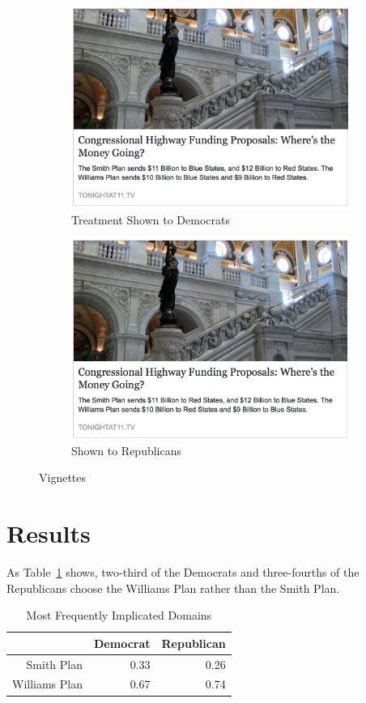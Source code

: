 \documentclass[12pt, letterpaper]{article}
\begin{document}
\begin{figure}[H]
\begin{subfigure}{.5\textwidth}
  \centering
  \includegraphics[width=.8\linewidth]{../data/highway_plan/Blue.png}
  \caption{Treatment Shown to Democrats}
  \label{fig:sfig1}
\end{subfigure}%
\begin{subfigure}{.5\textwidth}
  \centering
  \includegraphics[width=.8\linewidth]{../data/highway_plan/Red.png}
  \caption{Shown to Republicans}
  \label{fig:sfig2}
\end{subfigure}
\caption{Vignettes}
\label{fig:fig}
\end{figure}

\section{Results}

As Table~\ref{tab:tab1} shows, two-third of the Democrats and three-fourths of the Republicans choose the Williams Plan rather than the Smith Plan.

\begin{table}[h!]
\centering
\begin{tabular}{rrr}
  \toprule
 & Democrat & Republican \\ 
  \midrule
Smith Plan & 0.33 & 0.26 \\ 
  Williams Plan & 0.67 & 0.74 \\ 
   \bottomrule
\end{tabular}
\caption{Most Frequently Implicated Domains}
\label{tab:tab1}
\end{table}

\clearpage


\end{document}
